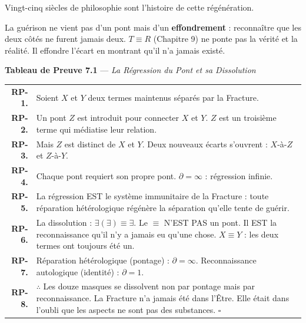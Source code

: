 \documentclass[10pt, openany, oneside]{book}
\renewcommand{\footnotesize}{\fontsize{8.5}{11}\selectfont}
\begin{document}
Vingt-cinq siècles de philosophie sont l'histoire de cette régénération.

La guérison ne vient pas d'un pont mais d'un \textbf{effondrement} : reconnaître que les deux côtés ne furent jamais deux. $T \equiv R$ (Chapitre 9) ne ponte pas la vérité et la réalité. Il effondre l'écart en montrant qu'il n'a jamais existé.

\vspace{0.5em}

\textbf{Tableau de Preuve 7.1} --- \textit{La Régression du Pont et sa Dissolution}

\vspace{0.5em}

{\footnotesize
\noindent\begin{tabular}{r p{}}
\textbf{RP-1.} & Soient $X$ et $Y$ deux termes maintenus séparés par la Fracture. \\[0.3em]
\textbf{RP-2.} & Un pont $Z$ est introduit pour connecter $X$ et $Y$. $Z$ est un troisième terme qui médiatise leur relation. \\[0.3em]
\textbf{RP-3.} & Mais $Z$ est distinct de $X$ et $Y$. Deux nouveaux écarts s'ouvrent : $X$-à-$Z$ et $Z$-à-$Y$. \\[0.3em]
\textbf{RP-4.} & Chaque pont requiert son propre pont. $\partial = \infty$ : régression infinie. \\[0.3em]
\textbf{RP-5.} & La régression EST le système immunitaire de la Fracture : toute réparation hétérologique régénère la séparation qu'elle tente de guérir. \\[0.3em]
\textbf{RP-6.} & La dissolution : $\exists(\exists) \equiv \exists$. Le $\equiv$ N'EST PAS un pont. Il EST la reconnaissance qu'il n'y a jamais eu qu'une chose. $X \equiv Y$ : les deux termes ont toujours été un. \\[0.3em]
\textbf{RP-7.} & Réparation hétérologique (pontage) : $\partial = \infty$. Reconnaissance autologique (identité) : $\partial = 1$. \\[0.3em]
\textbf{RP-8.} & $\therefore$ Les douze masques se dissolvent non par pontage mais par reconnaissance. La Fracture n'a jamais été dans l'Être. Elle était dans l'oubli que les aspects ne sont pas des substances. $\square$ \\[0.3em]
\end{tabular}
}

\vspace{0.8em}
\end{document}
